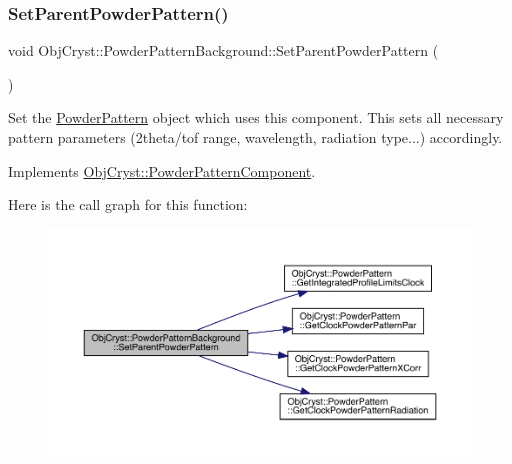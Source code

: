 \mbox{\label{class_obj_cryst_1_1_powder_pattern_background_a74b0128b9f2c6be0302f67e132ed4aed}} 
\subsubsection{\texorpdfstring{SetParentPowderPattern()}{SetParentPowderPattern()}}
{\footnotesize\ttfamily void Obj\+Cryst\+::\+Powder\+Pattern\+Background\+::\+Set\+Parent\+Powder\+Pattern (\begin{DoxyParamCaption}\item[{\mbox{\hyperlink{class_obj_cryst_1_1_powder_pattern}{Powder\+Pattern}} \&}]{ }\end{DoxyParamCaption})\hspace{0.3cm}{\ttfamily [virtual]}}

Set the \mbox{\hyperlink{class_obj_cryst_1_1_powder_pattern}{Powder\+Pattern}} object which uses this component. This sets all necessary pattern parameters (2theta/tof range, wavelength, radiation type...) accordingly. 

Implements \mbox{\hyperlink{class_obj_cryst_1_1_powder_pattern_component_a6b3dc911118c280dbbdcb7fb97acf980}{Obj\+Cryst\+::\+Powder\+Pattern\+Component}}.

Here is the call graph for this function\+:
\nopagebreak
\begin{figure}[H]
\begin{center}
\leavevmode
\includegraphics[width=350pt]{class_obj_cryst_1_1_powder_pattern_background_a74b0128b9f2c6be0302f67e132ed4aed_cgraph}
\end{center}
\end{figure}



